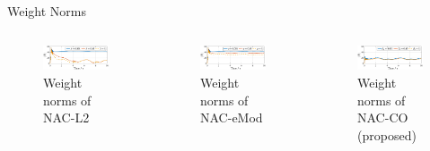 \documentclass[8pt, aspectratio=169]{beamer}
\begin{document}
\begin{frame}{\insertsubsectionhead}{Weight Norms}

  \begin{columns}


      \begin{figure}      
        \includegraphics[width=0.99\textwidth]{figures/ECC/fig9.eps}
        \caption{Weight norms of NAC-L2}
      \end{figure}
      

      \begin{figure}
        \includegraphics[width=0.99\textwidth]{figures/ECC/fig10.eps}
        \caption{Weight norms of NAC-eMod}
      \end{figure}


      \begin{figure}
        \includegraphics[width=0.99\textwidth]{figures/ECC/fig8.eps}
        \caption{Weight norms of NAC-CO (proposed)}
      \end{figure}
      

\end{columns}
\end{frame}
\end{document}
